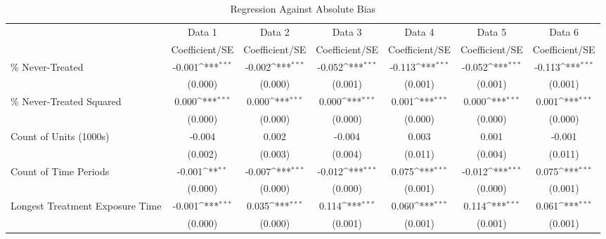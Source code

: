 \begin{table}[htbp]\centering
\def\sym#1{\ifmmode^{#1}\else\(^{#1}\)\fi}
\caption{Regression Against Absolute Bias}
\begin{tabular}{l*{6}{c}}
\hline\hline
                    &\multicolumn{1}{c}{Data 1}&\multicolumn{1}{c}{Data 2}&\multicolumn{1}{c}{Data 3}&\multicolumn{1}{c}{Data 4}&\multicolumn{1}{c}{Data 5}&\multicolumn{1}{c}{Data 6}\\
                    &Coefficient/SE         &Coefficient/SE         &Coefficient/SE         &Coefficient/SE         &Coefficient/SE         &Coefficient/SE         \\
\hline
\% Never-Treated    &      -0.001\sym{***}&      -0.002\sym{***}&      -0.052\sym{***}&      -0.113\sym{***}&      -0.052\sym{***}&      -0.113\sym{***}\\
                    &     (0.000)         &     (0.000)         &     (0.001)         &     (0.001)         &     (0.001)         &     (0.001)         \\
\% Never-Treated Squared&       0.000\sym{***}&       0.000\sym{***}&       0.000\sym{***}&       0.001\sym{***}&       0.000\sym{***}&       0.001\sym{***}\\
                    &     (0.000)         &     (0.000)         &     (0.000)         &     (0.000)         &     (0.000)         &     (0.000)         \\
Count of Units (1000s)&      -0.004         &       0.002         &      -0.004         &       0.003         &       0.001         &      -0.001         \\
                    &     (0.002)         &     (0.003)         &     (0.004)         &     (0.011)         &     (0.004)         &     (0.011)         \\
Count of Time Periods&      -0.001\sym{**} &      -0.007\sym{***}&      -0.012\sym{***}&       0.075\sym{***}&      -0.012\sym{***}&       0.075\sym{***}\\
                    &     (0.000)         &     (0.000)         &     (0.000)         &     (0.001)         &     (0.000)         &     (0.001)         \\
Longest Treatment Exposure Time&      -0.001\sym{***}&       0.035\sym{***}&       0.114\sym{***}&       0.060\sym{***}&       0.114\sym{***}&       0.061\sym{***}\\
                    &     (0.000)         &     (0.000)         &     (0.001)         &     (0.001)         &     (0.001)         &     (0.001)         \\

\end{tabular}
\end{table}
